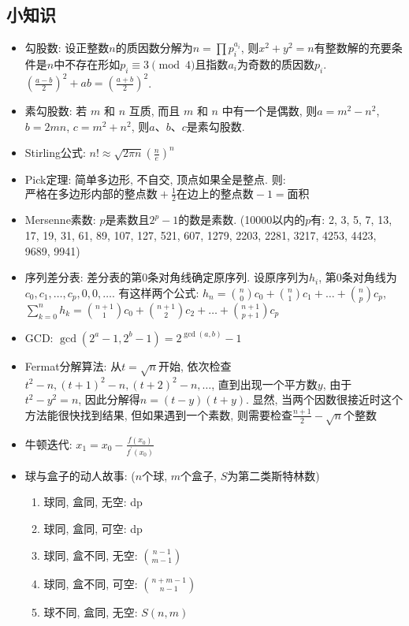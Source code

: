 \documentclass[landscape, twocolumn, 8pt, a4paper, twoside]{extarticle}
\begin{document}
\begin{spacing}{0.1}
\subsection{小知识}
\begin{itemize}
\item 勾股数: 设正整数$n$的质因数分解为$n = \prod p_i ^ {a_i}$, 
  则$x^2+y^2=n$有整数解的充要条件是$n$中不存在形如$p_i \equiv 3\pmod{4}$且指数$a_i$为奇数的质因数$p_i$.
  $(\frac{a - b}{2})^2 + ab = (\frac{a + b}{2})^2$.
\item 素勾股数: 若 $m$ 和 $n$ 互质, 而且 $m$ 和 $n$ 中有一个是偶数, 则$a = m^2 - n^2$, $b = 2mn$, $c = m^2 + n^2$, 则$a$、$b$、$c$是素勾股数. 
\item Stirling公式: $n! \approx \sqrt{2 \pi n} (\frac{n}{e})^n$
\item Pick定理: 简单多边形, 不自交, 顶点如果全是整点. 则: 
  $ \textrm{严格在多边形内部的整点数} + \frac{1}{2} \textrm{在边上的整点数} - 1 = \textrm{面积}$
\item Mersenne素数: $p$是素数且$2^p-1$的数是素数. (10000以内的$p$有: 2, 3, 5, 7, 13, 17, 19, 31, 61, 89, 107, 127, 521, 607, 1279, 2203, 2281, 3217, 4253, 4423, 9689, 9941)
\item 序列差分表: 差分表的第$0$条对角线确定原序列. 
  设原序列为$h_i$, 第$0$条对角线为$c_0,c_1,\ldots,c_p,0,0,\ldots$. 
  有这样两个公式: 
  $h_n = \binom{n}{0}c_0 + \binom{n}{1}c_1 + \ldots + \binom{n}{p} c_p$, 
  $\sum_{k = 0}^{n}h_k = \binom{n+1}{1}c_0 + \binom{n+1}{2}c_2 + \ldots + \binom{n+1}{p+1}c_p$
\item GCD:
  $\gcd(2^a-1,2^b-1)=2^{\gcd(a,b)}-1$
\item Fermat分解算法: 
  从$t=\sqrt{n}$开始, 
  依次检查$t^2-n,(t+1)^2-n,(t+2)^2-n,\ldots$, 
  直到出现一个平方数$y$, 
  由于$t ^ 2 - y ^ 2 = n$, 
  因此分解得$n = (t -y)(t + y)$. 
  显然, 当两个因数很接近时这个方法能很快找到结果, 
  但如果遇到一个素数, 则需要检查$\frac{n + 1}{2} - \sqrt{n}$个整数
\item 牛顿迭代:
  $x_1 = x_0 - \frac{f(x_0)}{f^\prime(x_0)}$
\item 球与盒子的动人故事: ($n$个球, $m$个盒子, $S$为第二类斯特林数)
  \begin{enumerate}
  \item 球同, 盒同, 无空: dp
  \item 球同, 盒同, 可空: dp
  \item 球同, 盒不同, 无空: $\binom{n - 1}{m - 1}$
  \item 球同, 盒不同, 可空: $\binom{n + m - 1}{n - 1}$
  \item 球不同, 盒同, 无空: $S(n, m)$

\end{enumerate}
\end{itemize}
\end{spacing}
\end{document}
